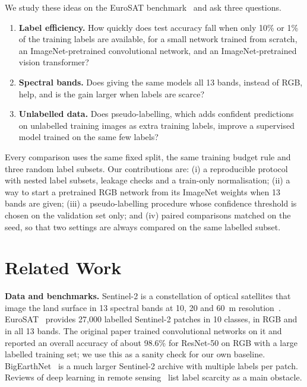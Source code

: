 \documentclass[twoside,a4paper,11pt]{article}
\begin{document}
We study these ideas on the EuroSAT benchmark~\cite{helber2019eurosat} and ask three questions.
\begin{enumerate}
\item \textbf{Label efficiency.} How quickly does test accuracy fall when only 10\% or 1\% of the training labels are available, for a small network trained from scratch, an ImageNet-pretrained convolutional network, and an ImageNet-pretrained vision transformer?
\item \textbf{Spectral bands.} Does giving the same models all 13 bands, instead of RGB, help, and is the gain larger when labels are scarce?
\item \textbf{Unlabelled data.} Does pseudo-labelling, which adds confident predictions on unlabelled training images as extra training labels, improve a supervised model trained on the same few labels?
\end{enumerate}
Every comparison uses the same fixed split, the same training budget rule and three random label subsets. Our contributions are: (i) a reproducible protocol with nested label subsets, leakage checks and a train-only normalisation; (ii) a way to start a pretrained RGB network from its ImageNet weights when 13 bands are given; (iii) a pseudo-labelling procedure whose confidence threshold is chosen on the validation set only; and (iv) paired comparisons matched on the seed, so that two settings are always compared on the same labelled subset.

\section{Related Work}\label{sec:related}
\textbf{Data and benchmarks.} Sentinel-2 is a constellation of optical satellites that image the land surface in 13 spectral bands at 10, 20 and 60~m resolution~\cite{drusch2012sentinel}. EuroSAT~\cite{helber2019eurosat} provides 27{,}000 labelled Sentinel-2 patches in 10 classes, in RGB and in all 13 bands. The original paper trained convolutional networks on it and reported an overall accuracy of about 98.6\% for ResNet-50 on RGB with a large labelled training set; we use this as a sanity check for our own baseline. BigEarthNet~\cite{sumbul2019bigearthnet} is a much larger Sentinel-2 archive with multiple labels per patch. Reviews of deep learning in remote sensing~\cite{zhu2017review} list label scarcity as a main obstacle.
\end{document}
